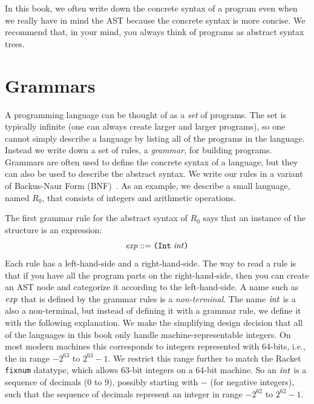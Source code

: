 \documentclass[11pt]{book}
\begin{document}
In this book, we often write down the concrete syntax of a program
even when we really have in mind the AST because the concrete syntax
is more concise.  We recommend that, in your mind, you always think of
programs as abstract syntax trees.

\section{Grammars}
\label{sec:grammar}

A programming language can be thought of as a \emph{set} of programs.
The set is typically infinite (one can always create larger and larger
programs), so one cannot simply describe a language by listing all of
the programs in the language. Instead we write down a set of rules, a
\emph{grammar}, for building programs. Grammars are often used to
define the concrete syntax of a language, but they can also be used to
describe the abstract syntax. We write our rules in a variant of
Backus-Naur Form (BNF)~\citep{Backus:1960aa,Knuth:1964aa}.
As an example, we describe a small language, named $R_0$, that consists of
integers and arithmetic operations.

The first grammar rule for the abstract syntax of $R_0$ says that an
instance of the  structure is an expression:
\begin{equation}
\mathit{exp} ::= \texttt{(Int}\;\mathit{int}\texttt{)}  \label{eq:arith-int}
\end{equation}
%
Each rule has a left-hand-side and a right-hand-side. The way to read
a rule is that if you have all the program parts on the
right-hand-side, then you can create an AST node and categorize it
according to the left-hand-side.
%
A name such as $\mathit{exp}$ that is
defined by the grammar rules is a \emph{non-terminal}.
%
The name $\mathit{int}$ is a also a non-terminal, but instead of defining it
with a grammar rule, we define it with the following explanation.  We
make the simplifying design decision that all of the languages in this
book only handle machine-representable integers.  On most modern
machines this corresponds to integers represented with 64-bits, i.e.,
the in range $-2^{63}$ to $2^{63}-1$.  We restrict this range further
to match the Racket \texttt{fixnum} datatype, which allows 63-bit
integers on a 64-bit machine. So an $\mathit{int}$ is a sequence of decimals
($0$ to $9$), possibly starting with $-$ (for negative integers), such
that the sequence of decimals represent an integer in range $-2^{62}$
to $2^{62}-1$.
\end{document}
